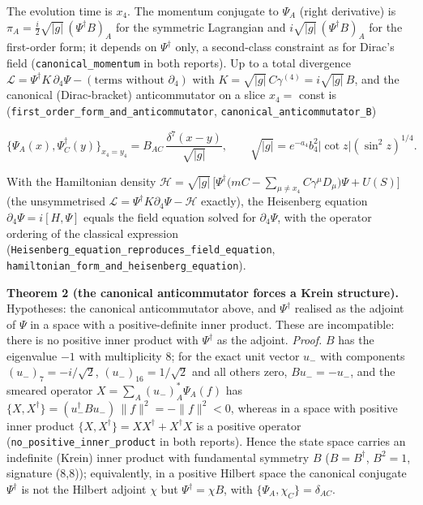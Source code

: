 \documentclass[11pt]{article}
\begin{document}
The evolution time is $x_4$. The momentum conjugate to $\Psi_A$ (right derivative) is $\pi_A = \frac{i}{2}\sqrt{|g|}\,(\Psi^\dagger B)_A$ for the symmetric Lagrangian and $i\sqrt{|g|}\,(\Psi^\dagger B)_A$ for the first-order form; it depends on $\Psi^\dagger$ only, a second-class constraint as for Dirac's field (\texttt{canonica\allowbreak{}l\_moment\allowbreak{}um} in both reports). Up to a total divergence $\mathcal{L} = \Psi^\dagger K\,\partial_4\Psi - (\text{terms without }\partial_4)$ with $K = \sqrt{|g|}\,C\gamma^{(4)} = i\sqrt{|g|}\,B$, and the canonical (Dirac-bracket) anticommutator on a slice $x_4 = $ const is (\texttt{first\_or\allowbreak{}der\_form\allowbreak{}\_and\_ant\allowbreak{}icommuta\allowbreak{}tor}, \texttt{canonica\allowbreak{}l\_antico\allowbreak{}mmutator\allowbreak{}\_B})

\[
\{\Psi_A(x), \Psi^\dagger_C(y)\}_{x_4 = y_4} = B_{AC}\,\frac{\delta^7(x - y)}{\sqrt{|g|}},\qquad \sqrt{|g|} = e^{-a_4}b_4^2|\cot z|(\sin^2 z)^{1/4} .
\]

With the Hamiltonian density $\mathcal{H} = \sqrt{|g|}\,\big[\Psi^\dagger\big(mC - \sum_{\mu\neq x_4}C\gamma^\mu D_\mu\big)\Psi + U(S)\big]$ (the unsymmetrised $\mathcal{L} = \Psi^\dagger K\partial_4\Psi - \mathcal{H}$ exactly), the Heisenberg equation $\partial_4\Psi = i[H, \Psi]$ equals the field equation solved for $\partial_4\Psi$, with the operator ordering of the classical expression (\texttt{Heisenbe\allowbreak{}rg\_equat\allowbreak{}ion\_repr\allowbreak{}oduces\_f\allowbreak{}ield\_equ\allowbreak{}ation}, \texttt{hamilton\allowbreak{}ian\_form\allowbreak{}\_and\_hei\allowbreak{}senberg\_\allowbreak{}equation}).

\textbf{Theorem 2 (the canonical anticommutator forces a Krein structure).} Hypotheses: the canonical anticommutator above, and $\Psi^\dagger$ realised as the adjoint of $\Psi$ in a space with a positive-definite inner product. These are incompatible: there is no positive inner product with $\Psi^\dagger$ as the adjoint. \emph{Proof.} $B$ has the eigenvalue $-1$ with multiplicity 8; for the exact unit vector $u_-$ with components $(u_-)_7 = -i/\sqrt2$, $(u_-)_{16} = 1/\sqrt2$ and all others zero, $Bu_- = -u_-$, and the smeared operator $X = \sum_A (u_-)_A^*\Psi_A(f)$ has $\{X, X^\dagger\} = (u_-^\dagger Bu_-)\,\lVert f\rVert^2 = -\lVert f\rVert^2 < 0$, whereas in a space with positive inner product $\{X, X^\dagger\} = XX^\dagger + X^\dagger X$ is a positive operator (\texttt{no\_posit\allowbreak{}ive\_inne\allowbreak{}r\_produc\allowbreak{}t} in both reports). Hence the state space carries an indefinite (Krein) inner product with fundamental symmetry $B$ ($B = B^\dagger$, $B^2 = 1$, signature (8,8)); equivalently, in a positive Hilbert space the canonical conjugate $\Psi^\dagger$ is not the Hilbert adjoint $\chi$ but $\Psi^\dagger = \chi B$, with $\{\Psi_A, \chi_C\} = \delta_{AC}$.
\end{document}

